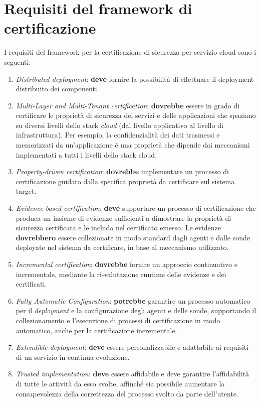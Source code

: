 \documentclass[../main.tex]{subfiles}
\begin{document}
\section{Requisiti del framework di certificazione}

I requisiti del framework per la certificazione di sicurezza per servizio cloud sono i seguenti:\cite{Cloud1}
\begin{enumerate}
\item \textit{Distributed deployment}: \textbf{deve} fornire la possibilità di effettuare il deployment distribuito dei componenti.
\item \textit{Multi-Layer and Multi-Tenant certification}: \textbf{dovrebbe} essere in grado di certificare le  proprietà di sicurezza dei servizi e delle applicazioni che spaziano su diversi livelli dello stack \textit{cloud} (dal livello applicativo al livello di infrastruttura). Per esempio, la confidenzialità dei dati trasmessi e memorizzati da un'applicazione è una proprietà che dipende dai meccanismi implementati a tutti i livelli dello stack cloud.
\item \textit{Property-driven certification}: \textbf{dovrebbe} implementare un processo di certificazione guidato dalla specifica proprietà da certificare sul sistema target.
\item \textit{Evidence-based certification}: \textbf{deve} supportare un processo di certificazione che produca un insieme di evidenze sufficienti a dimostrare la proprietà di sicurezza certificata e le includa nel certificato emesso. Le evidenze \textbf{dovrebbero} essere collezionate in modo standard dagli agenti e dalle sonde deployate nel sistema da certificare, in base al meccanismo utilizzato.
\item \textit{Incremental certification}: \textbf{dovrebbe} fornire un approccio continuativo e incrementale, mediante la ri-valutazione runtime delle evidenze e dei certificati. 
\item \textit{Fully Automatic Configuration}: \textbf{potrebbe} garantire un processo automatico per il \textit{deployment} e la configurazione degli agenti e delle sonde, supportando il collezionamento e l'esecuzione di processi di certificazione in modo automatico, anche per la certificazione incrementale.
\item \textit{Extendible deployment}: \textbf{deve} essere personalizzabile e adattabile ai requisiti di un servizio in continua evoluzione.
\item \textit{Trusted implementation}: \textbf{deve} essere affidabile e deve garantire l'affidabilità di tutte le attività da esso svolte, affinché sia possibile aumentare la consapevolezza della correttezza del processo svolto da parte dell'utente.
\end{enumerate}
\end{document}
